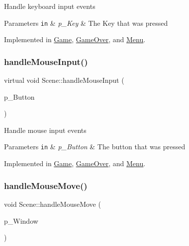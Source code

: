 Handle keyboard input events 
\begin{DoxyParams}[1]{Parameters}
\mbox{\tt in}  & {\em p\+\_\+\+Key} & The Key that was pressed \\
\hline
\end{DoxyParams}


Implemented in \hyperlink{class_game_a6ccc7e91593f06a0e722cc419016a237}{Game}, \hyperlink{class_game_over_aae04263371e8f82199df51de54ef77d1}{Game\+Over}, and \hyperlink{class_menu_a2ebc63a5e64b90dcfae4284e7f7f4be6}{Menu}.

\mbox{\label{class_scene_ad9240c92a58c4dba4c2409ec8bcff686}} 
\subsubsection{\texorpdfstring{handle\+Mouse\+Input()}{handleMouseInput()}}
{\footnotesize\ttfamily virtual void Scene\+::handle\+Mouse\+Input (\begin{DoxyParamCaption}\item[{sf\+::\+Mouse\+::\+Button}]{p\+\_\+\+Button }\end{DoxyParamCaption})\hspace{0.3cm}{\ttfamily [pure virtual]}}

Handle mouse input events 
\begin{DoxyParams}[1]{Parameters}
\mbox{\tt in}  & {\em p\+\_\+\+Button} & The button that was pressed \\
\hline
\end{DoxyParams}


Implemented in \hyperlink{class_game_a1c0ddbb7a468997249acbdd6cf2dbe34}{Game}, \hyperlink{class_game_over_a83c0cecb3faab5ea8c36272e931006f7}{Game\+Over}, and \hyperlink{class_menu_a4f99fe96e47268bd4561df0c8faa23c8}{Menu}.

\mbox{\label{class_scene_a2cdbd23d08e1faa0becceaf8bd130ac7}} 
\subsubsection{\texorpdfstring{handle\+Mouse\+Move()}{handleMouseMove()}}
{\footnotesize\ttfamily void Scene\+::handle\+Mouse\+Move (\begin{DoxyParamCaption}\item[{const sf\+::\+Render\+Window \&}]{p\+\_\+\+Window }\end{DoxyParamCaption})}

